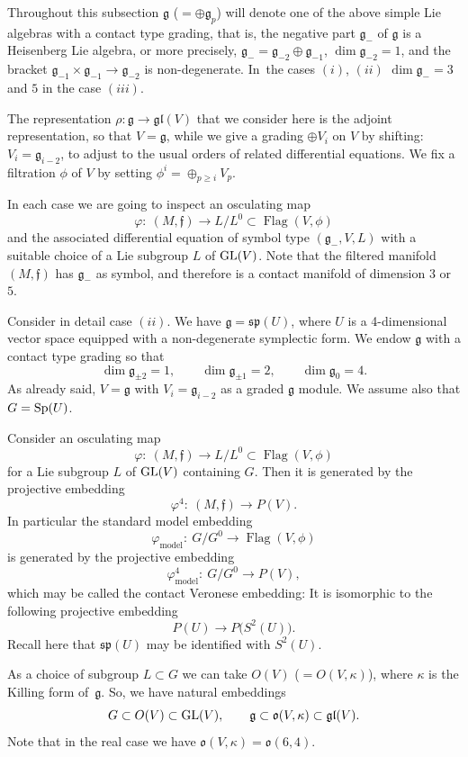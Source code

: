 \documentclass[10pt,a4paper]{amsart}
\newcommand{\g}{\mathfrak g}
\newcommand{\Flag}{\operatorname{Flag}}
\numberwithin{equation}{section}
\begin{document}
Throughout this subsection $\g$ ($= \oplus\g_p$) will denote one of the above simple Lie algebras with a contact type grading, that is, the negative part $\g_-$ of $\g$ is a Heisenberg Lie algebra, or more precisely, $\g_- = \g_{-2} \oplus \g_{-1}$, $\dim \g_{-2} = 1 $, and the bracket $\g_{-1} \times \g _{-1} \to \g_{-2}$
is non-degenerate. In~the cases $(i)$, $(ii)$ $\dim \g_- = 3$ and $5$ in the case $(iii)$.

The representation $\rho\colon \g \to \mathfrak{gl}(V)$ that we consider here is the adjoint representation, so that $V = \g$, while we give a grading $\oplus V_i $ on $V$ by shifting: $V_i = \g_{i-2}$, to adjust to the usual orders of related differential equations. We fix a filtration $\phi$ of $V$ by setting $\phi^i = \oplus_{p \ge i }V_p$.

In each case we are going to inspect an osculating map
\[
\varphi \colon\ (M, \mathfrak f ) \to L/ L^0 \subset \Flag(V,\phi)
\]
and the associated differential equation of symbol type $(\g_-, V, L)$ with a suitable choice of a Lie subgroup $L$ of ${\rm GL}(V)$. Note that the filtered manifold $(M, \mathfrak f)$ has $\g_-$ as symbol, and therefore is a contact manifold of dimension $3$ or $5$.

Consider in detail case $(ii)$. We have $\g=\mathfrak{sp}(U)$, where $U$ is a 4-dimensional vector space equipped with a non-degenerate symplectic form. We endow $\g$ with a contact type grading so that
\[
	\dim \g_{\pm 2} = 1,\qquad \dim \g_{\pm1}=2,\qquad \dim\g_0=4.
\]
As already said, $V = \g$ with $V_i = \mathfrak g_{i-2}$ as a graded $\g$ module. We assume also that $G = {\rm Sp}(U)$.

Consider an osculating map
\[
	\varphi\colon\ (M, \mathfrak f) \to L/L^0 \subset \Flag(V, \phi)
\]
for a Lie subgroup $L$ of ${\rm GL}(V)$ containing $G$. Then it is generated by the projective embedding
\[
	\varphi^4 \colon\ (M, \mathfrak f ) \to P(V).
\]
In particular the standard model embedding
\[
	\varphi_{\mathrm{model}} \colon\ G/G^0 \to \Flag(V, \phi)
\]
is generated by the projective embedding
\[
	\varphi^4_{\mathrm{model}} \colon\ G/G^0 \to P(V),
\]
which may be called the contact Veronese embedding: It is isomorphic to the following projective embedding
\[
	P(U) \to P\big(S^2(U)\big).
\]
Recall here that $\mathfrak{sp}(U)$ may be identified with $S^2(U)$.

As a choice of subgroup $L\subset G$ we can take $O(V)$ ($=O(V,\kappa)$), where $\kappa$ is the Killing form of~$\g$. So, we have natural embeddings
\[
G\subset O(V)\subset {\rm GL}(V), \qquad \g\subset \mathfrak{o}(V,\kappa)\subset \mathfrak{gl}(V).
\]
Note that in the real case we have $\mathfrak{o}(V,\kappa)=\mathfrak{o}(6,4)$.
\end{document}
